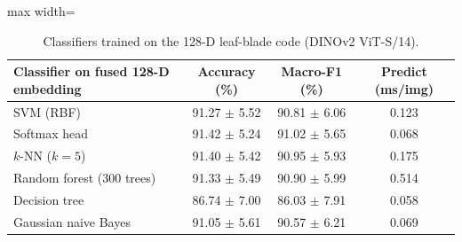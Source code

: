 \begin{table}[tbp]
\centering
\small
\caption{Classifiers trained on the 128-D leaf-blade code (DINOv2 ViT-S/14).}
\label{tab:classifiers}
\begin{adjustbox}{max width=\textwidth}
\begin{tabular}{lccc}
\toprule
Classifier on fused 128-D embedding & Accuracy (\%) & Macro-F1 (\%) & Predict (ms/img) \\
\midrule
SVM (RBF) & 91.27 $\pm$ 5.52 & 90.81 $\pm$ 6.06 & 0.123 \\
Softmax head & 91.42 $\pm$ 5.24 & 91.02 $\pm$ 5.65 & 0.068 \\
$k$-NN ($k=5$) & 91.40 $\pm$ 5.42 & 90.95 $\pm$ 5.93 & 0.175 \\
Random forest (300 trees) & 91.33 $\pm$ 5.49 & 90.90 $\pm$ 5.99 & 0.514 \\
Decision tree & 86.74 $\pm$ 7.00 & 86.03 $\pm$ 7.91 & 0.058 \\
Gaussian naive Bayes & 91.05 $\pm$ 5.61 & 90.57 $\pm$ 6.21 & 0.069 \\
\bottomrule
\end{tabular}
\end{adjustbox}
\end{table}
